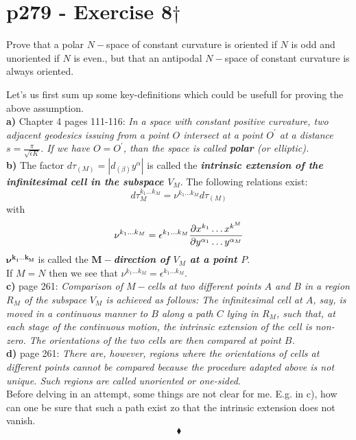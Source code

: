 \section{p279 - Exercise 8$\dagger$}
\begin{tcolorbox}
Prove that a polar $N-$space of constant curvature is oriented if $N$ is odd and unoriented if $N$ is even., but that an antipodal $N-$space of constant curvature is always oriented.
\end{tcolorbox}
Let's us first sum up some key-definitions which could be usefull for proving the above assumption.\\
\textbf{a)} Chapter 4 pages 111-116: \textit{In a space with constant positive curvature, two adjacent geodesics issuing from a point $O$ intersect at a point $O^{'}$  at a distance $s=\frac{\pi}{\sqrt{\epsilon K}}$. If we have $O=O^{'}$, than the space is called \textbf{polar} (or elliptic).}\\
\textbf{b)} The factor $d\tau_{(M)} = \left|d_{(\beta)}y^{\alpha}\right|$ is called the \textbf{\textit{intrinsic extension of the infinitesimal cell in the subspace $V_M$}}. The following relations exist: 
$$d\tau_{M}^{k_1\dots k_M} = \nu^{k_1\dots k_M}d\tau_{(M)}$$ with $$\nu^{k_1\dots k_M}= \epsilon^{k_1 \dots k_M} \pdv{x^{k_1}\dots  x^{k^M}}{y^{\alpha_1}\dots y^{\alpha_M}}$$
$\mathbf{\nu^{k_1\dots k_M}}$ is called the \textbf{\textit{$\mathbf{M}-$direction of $V_M$ at a point $P$}}.\\
If $M=N$ then we see that $\nu^{k_1\dots k_M}=\epsilon^{k_1 \dots k_M} $.\\
\textbf{c)} page 261: \textit{Comparison of $M-$cells at two different points $A$ and $B$ in a region $R_M$ of the subspace $V_M$ is achieved as follows: The infinitesimal cell at $A$, say, is moved in a continuous manner to $B$ along a path $C$ lying in $R_M$, such that, at each stage of the continuous motion, the intrinsic extension of the cell is non-zero. The orientations of the two cells are then compared at point $B$. }\\
\textbf{d)} page 261: \textit{There are, however, regions where the orientations of cells at different points cannot be compared because the procedure adapted above is not unique. Such regions are called unoriented or one-sided.}\\
Before delving in an attempt, some things are not clear for me.
E.g. in c), how can one be sure that such a path exist zo that the intrinsic extension does not vanish.
$$\blacklozenge$$
\newpage



